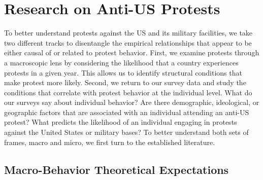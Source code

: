 
\section*{Research on Anti-US Protests}

To better understand protests against the US and its military facilities, we take two different tracks to disentangle the empirical relationships that appear to be either causal of or related to protest behavior. First, we examine protests through a macroscopic lens by considering the likelihood that a country experiences protests in a given year. This allows us to identify structural conditions that make protest more likely. Second, we return to our survey data and study the conditions that correlate with protest behavior at the individual level. What do our surveys say about individual behavior? Are there demographic, ideological, or geographic factors that are associated with an individual attending an anti-US protest? What predicts the likelihood of an individual engaging in protests against the United States or military bases? To better understand both sets of frames, macro and micro, we first turn to the established literature.


\subsection*{Macro-Behavior Theoretical Expectations}
 


